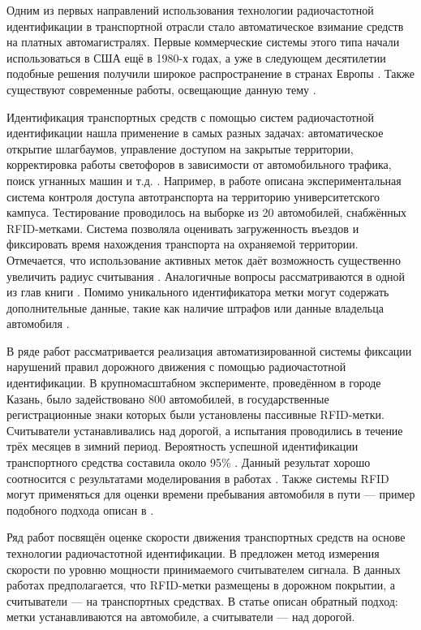 \documentclass[12pt]{article}
\theoremstyle{definition}
\begin{document}
Одним из первых направлений использования технологии радиочастотной идентификации в транспортной отрасли стало автоматическое взимание средств на платных автомагистралях. Первые коммерческие системы этого типа начали использоваться в США ещё в 1980-х годах, а уже в следующем десятилетии подобные решения получили широкое распространение в странах Европы \cite{Blythe1999, J.2005}. Также существуют современные работы, освещающие данную тему \cite{Mazumder2025, Wadhwa2025}.

Идентификация транспортных средств с помощью систем радиочастотной идентификации нашла применение в самых разных задачах: автоматическое открытие шлагбаумов, управление доступом на закрытые территории, корректировка работы светофоров в зависимости от автомобильного трафика, поиск угнанных машин и т.д. \cite{Tseng2007, Bhavke2017, Rajeshwari2015, Balbin2017, Pan2023}. Например, в работе \cite{Pedraza2018} описана экспериментальная система контроля доступа автотранспорта на территорию университетского кампуса. Тестирование проводилось на выборке из 20 автомобилей, снабжённых RFID-метками. Система позволяла оценивать загруженность въездов и фиксировать время нахождения транспорта на охраняемой территории. Отмечается, что использование активных меток даёт возможность существенно увеличить радиус считывания \cite{Khan2011}. Аналогичные вопросы рассматриваются в одной из глав книги \cite{Ibrahim2025}. Помимо уникального идентификатора метки могут содержать дополнительные данные, такие как наличие штрафов или данные владельца автомобиля \cite{MenesesGonzalez2011, Lonkar2018}.

В ряде работ \cite{Vishn2012, Vishn2012_3, Vishn2013, Vishnevsky2016RFID} рассматривается реализация автоматизированной системы фиксации нарушений правил дорожного движения с помощью радиочастотной идентификации. В крупномасштабном эксперименте, проведённом в городе Казань, было задействовано 800 автомобилей, в государственные регистрационные знаки которых были установлены пассивные RFID-метки. Считыватели устанавливались над дорогой, а испытания проводились в течение трёх месяцев в зимний период. Вероятность успешной идентификации транспортного средства составила около 95\% \cite{Vishn2017}. Данный результат хорошо соотносится с результатами моделирования в работах \cite{Larionov2018, Vishn2023, Larionov2017, Jo2009}. Также системы RFID могут применяться для оценки времени пребывания автомобиля в пути — пример подобного подхода описан в \cite{Gu2021}.

Ряд работ посвящён оценке скорости движения транспортных средств на основе технологии радиочастотной идентификации. В \cite{Zhai2018, Jing2013} предложен метод измерения скорости по уровню мощности принимаемого считывателем сигнала. В данных работах предполагается, что RFID-метки размещены в дорожном покрытии, а считыватели — на транспортных средствах. В статье \cite{Choy2020} описан обратный подход: метки устанавливаются на автомобиле, а считыватели — над дорогой.
\end{document}

